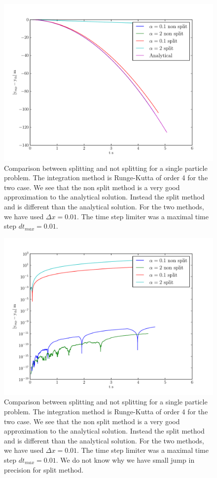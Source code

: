 \begin{figure}
\includegraphics{topology/single_part/tab2.pdf}
\caption{Comparison between splitting and not splitting for a single particle problem. 
The integration method is Runge-Kutta of order 4 for the two case.
We see that the non split method is a very good approximation to the analytical solution.
Instead the split method  and is different than the analytical solution.
For the two methods, we have used $\Delta x=0.01$. The time step limiter was a maximal time step $dt_{max}=0.01$.
}
\label{topo:singl_part:fig1}
\end{figure}

\begin{figure}
\includegraphics{topology/single_part/tab.pdf}
\caption{Comparison between splitting and not splitting for a single particle problem. 
The integration method is Runge-Kutta of order 4 for the two case.
We see that the non split method is a very good approximation to the analytical solution.
Instead the split method  and is different than the analytical solution.
For the two methods, we have used $\Delta x=0.01$. The time step limiter was a maximal time step $dt_{max}=0.01$.
We do not know why we have small jump in precision for split method.}
\label{topo:singl_part:fig2}
\end{figure}


